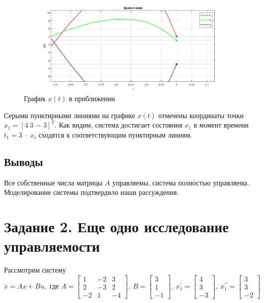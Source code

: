 \documentclass[a4paper, 12pt]{article}
\begin{document}
    \begin{figure}[H]
        \centering
        \includegraphics[scale=0.44]{task_1_x_t_close.jpg}
        \captionsetup{skip=0pt}
        \caption{График $x(t)$ в приближении}
        \label{fig:task_1_modeling_2}
    \end{figure}
    \noindent Серыми пунктирными линиями на графике $x(t)$ отмечены координаты точки $x_1=\left[4\ 3\ -3\right]^T$.
    Как видим, система достигает состояния $x_1$ в момент времени $t_1=3$ -- $x_i$ сходятся к соответствующим пунктирным линиям.


    \subsection{Выводы}
    Все собственные числа матрицы $A$ управляемы, система полностью управляема. Моделирование системы подтвердило наши рассуждения.


    \section{Задание 2. Еще одно исследование управляемости}
    Рассмотрим систему
    $$
    \dot{x}=Ax+Bu,\text{ где }A=\begin{bmatrix}
        1 &-2 &3\\
        2 &-3 &2\\
        -2 &1 &-4
    \end{bmatrix},\ B=\begin{bmatrix}
        3\\
        1\\
        -1
    \end{bmatrix},\ x_1^{\prime}=\begin{bmatrix}
        4\\
        3\\
        -3
    \end{bmatrix},\ x_1^{\prime\prime}=\begin{bmatrix}
        3\\
        3\\
        -2
    \end{bmatrix}
    $$
\end{document}
